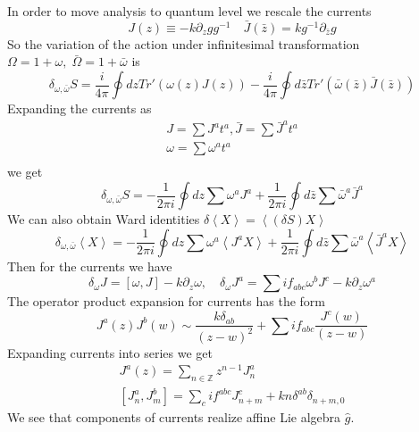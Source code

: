 \documentclass[a4paper,12pt]{article}
\theoremstyle{definition} \newtheorem{Def}{Definition}
\begin{document}
In order to move analysis to quantum level we rescale the currents
\begin{equation}
  \label{eq:82}
  J(z)\equiv -k \partial_zg g^{-1}\quad \bar J(\bar z)=k g^{-1}\partial_{\bar z}g
\end{equation}
So the variation of the action under infinitesimal transformation $\Omega=1+\omega,\; \bar \Omega =1+\bar \omega$ is
\begin{equation}
  \label{eq:83}
  \delta_{\omega,\bar\omega}S=\frac{i}{4\pi}\oint dz Tr' (\omega(z)J(z))-\frac{i}{4\pi}\oint d\bar z Tr'(\bar\omega(\bar z)\bar J(\bar z))
\end{equation}
Expanding the currents as
\begin{equation}
  \label{eq:85}
  \begin{aligned}
    J=\sum J^a t^a,\bar J=\sum \bar J^a t^a \\
    \omega=\sum \omega^a t^a\\
  \end{aligned}
\end{equation}
we get
\begin{equation}
  \label{eq:86}
  \delta_{\omega,\bar \omega}S=-\frac{1}{2\pi i}\oint dz \sum\omega^a J^a+\frac{1}{2\pi i} \oint d\bar z \sum \bar \omega^a \bar J^a
\end{equation}
We can also obtain Ward identities $\delta\left< X\right>=\left<(\delta S)X\right>$
\begin{equation}
  \label{eq:87}
  \delta_{\omega,\bar \omega}\left< X \right>=-\frac{1}{2\pi i}\oint dz \sum\omega^a \left< J^a X\right>+
  \frac{1}{2\pi i} \oint d\bar z \sum \bar \omega^a \left< \bar J^a X\right>
\end{equation}
Then for the currents we have
\begin{equation}
  \label{eq:88}
  \delta_{\omega}J=[\omega,J]-k\partial_z\omega,\quad \delta_{\omega}J^a=\sum i f_{abc}\omega^b J^c-k\partial_z\omega^a
\end{equation}
The operator product expansion for currents has the form
\begin{equation}
  \label{eq:89}
  J^a(z) J^b(w) \sim \frac{k\delta_{ab}}{(z-w)^2}+\sum i f_{abc}\frac{J^c(w)}{(z-w)}
\end{equation}
Expanding currents into series we get
\begin{equation}
  \label{eq:90}
  \begin{aligned}
    J^a(z)=\sum_{n\in \mathbb Z}z^{n-1}J^a_n\\    
    \left[J^a_n,J^b_m\right]=\sum_c i f^{abc}J^c_{n+m}+kn\delta^{ab}\delta_{n+m,0}  
  \end{aligned}
\end{equation}
We see that components of currents realize affine Lie algebra $\hat g$.  
\end{document}

